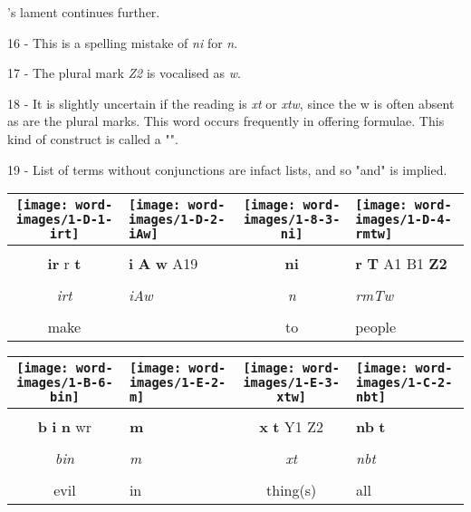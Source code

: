 \vspace*{\fill}

\pagebreak

\vspace*{\fill}

's lament continues further.

\vspace*{\fill}

16 - This is a spelling mistake of \textit{ni} for \textit{n}.

17 - The plural mark \textit{Z2} is vocalised as \textit{w}.

18 - It is slightly uncertain if the reading is \textit{xt} or \textit{xtw}, since the w is often absent as are the plural marks. This word occurs frequently in offering formulae. This kind of construct is called a "".

19 - List of terms without conjunctions are infact lists, and so "and" is implied.

\vspace*{\fill}

\pagebreak


\vspace*{\fill}

\begin{tabularx}{\linewidth}{cYcY}
	\texttt{[image: word-images/1-D-1-irt]} &
	\texttt{[image: word-images/1-D-2-iAw]} &
	\texttt{[image: word-images/1-8-3-ni]} &
	\texttt{[image: word-images/1-D-4-rmtw]} \\
	\hline \\ 
	\textbf{ir} r \textbf{t} &
	\textbf{i} \textbf{A} \textbf{w} A19 &
	\textbf{ni} &
	\textbf{r} \textbf{T} A1 B1 \textbf{Z2} \\
	\hline \\ 
	\textit{irt} & \textit{iAw} & \textit{n} & \textit{rmTw} \\
	\hline \\ 
	make &  & to & people
\end{tabularx}

\vspace{7.5mm}

\begin{tabularx}{\linewidth}{cYcY}
	\texttt{[image: word-images/1-B-6-bin]} &
	\texttt{[image: word-images/1-E-2-m]} &
	\texttt{[image: word-images/1-E-3-xtw]} &
	\texttt{[image: word-images/1-C-2-nbt]} \\
	\hline \\ 
	\textbf{b} \textbf{i} \textbf{n} wr &
	\textbf{m} &
	\textbf{x} \textbf{t} Y1 Z2 &
	\textbf{nb} \textbf{t} \\
	\hline \\ 
	\textit{bin} & \textit{m} & \textit{xt} & \textit{nbt} \\
	\hline \\ 
	evil & in & thing(s) & all
\end{tabularx}


